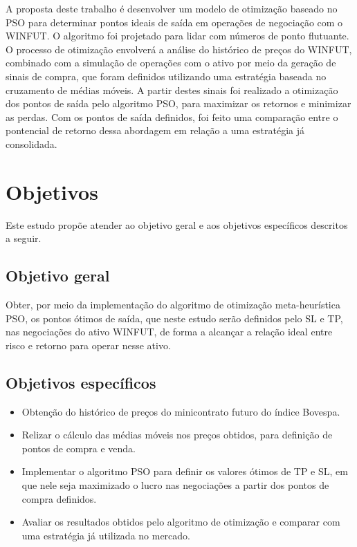 \documentclass{iftex2024}
\begin{document}
A proposta deste trabalho é desenvolver um modelo de otimização baseado no
PSO para determinar pontos ideais de saída em operações de negociação com o WINFUT. O
algoritmo foi projetado para lidar com números de ponto flutuante.
O processo de otimização envolverá a análise do histórico de preços do WINFUT,
combinado com a simulação de operações com o ativo por meio da geração de sinais de compra,
que foram definidos utilizando uma estratégia baseada no cruzamento
de médias móveis. A partir destes sinais foi realizado a otimização dos
pontos de saída pelo algoritmo PSO, para maximizar os retornos e minimizar as perdas. Com os pontos
de saída definidos, foi feito uma comparação entre o pontencial de retorno dessa abordagem
em relação a uma estratégia já consolidada.

\section{Objetivos}

Este estudo propõe atender ao objetivo geral e aos objetivos específicos descritos
a seguir.

\subsection{Objetivo geral}

Obter, por meio da implementação do algoritmo de otimização meta-heurística PSO, os pontos ótimos de saída, 
que neste estudo serão definidos pelo SL e TP, nas negociações do ativo WINFUT, 
de forma a alcançar a relação ideal entre risco e retorno para operar nesse ativo.

\subsection{Objetivos específicos}

\begin{itemize}
  \item Obtenção do histórico de preços do minicontrato futuro do índice Bovespa.
  \item Relizar o cálculo das médias móveis nos preços obtidos, para definição de pontos de compra e venda.
  \item Implementar o algoritmo PSO para definir os valores ótimos de TP e SL,
  em que nele seja maximizado o lucro nas negociações a partir dos pontos de compra
  definidos.
  \item Avaliar os resultados obtidos pelo algoritmo de otimização e comparar com uma estratégia já utilizada no mercado.
\end{itemize}
\end{document}
